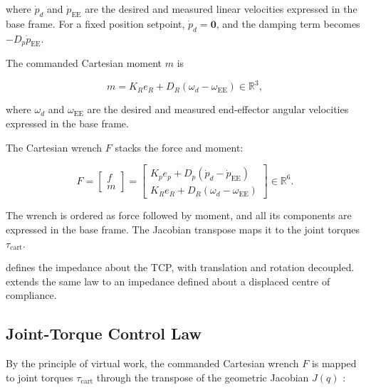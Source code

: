 where \mbox{\(\dot{p}_d\)} and \mbox{\(\dot{p}_{\mathrm{EE}}\)} are the desired and measured
linear velocities expressed in the base frame. For a fixed position setpoint,
\mbox{\(\dot{p}_d=\mathbf{0}\)}, and the damping term becomes
\mbox{\(-D_p\dot{p}_{\mathrm{EE}}\)}.

The commanded Cartesian moment \mbox{\(m\)} is

\begin{equation}
m
=
K_Re_R
+
D_R
\left(
\omega_d-\omega_{\mathrm{EE}}
\right)
\in\mathbb{R}^3,
\label{eq:rotational_impedance_moment}
\end{equation}

where \mbox{\(\omega_d\)} and \mbox{\(\omega_{\mathrm{EE}}\)} are the desired and
measured end-effector angular velocities expressed in the base frame.

The Cartesian wrench \mbox{\(F\)} stacks the force and moment:

\begin{equation}
F
=
\begin{bmatrix}
f\\
m
\end{bmatrix}
=
\begin{bmatrix}
K_pe_p
+
D_p\left(\dot{p}_d-\dot{p}_{\mathrm{EE}}\right)
\\[1mm]
K_Re_R
+
D_R\left(\omega_d-\omega_{\mathrm{EE}}\right)
\end{bmatrix}
\in\mathbb{R}^6.
\label{eq:cartesian_force_moment_vector}
\end{equation}

The wrench is ordered as force followed by moment, and all its components are
expressed in the base frame. The Jacobian transpose maps it to the joint
torques \mbox{\(\tau_{\mathrm{cart}}\)}.

\mbox{} defines the impedance about the
TCP, with translation and rotation decoupled.
\mbox{} extends the same law to an impedance
defined about a displaced centre of compliance.

\subsection{Joint-Torque Control Law}
\label{sec:control_law}

By the principle of virtual work, the commanded Cartesian wrench
\mbox{\(F\)} is mapped to joint torques \mbox{\(\tau_{\mathrm{cart}}\)} through
the transpose of the geometric Jacobian \mbox{\(J(q)\)}
\mbox{\cite{Khatib1987}}:

